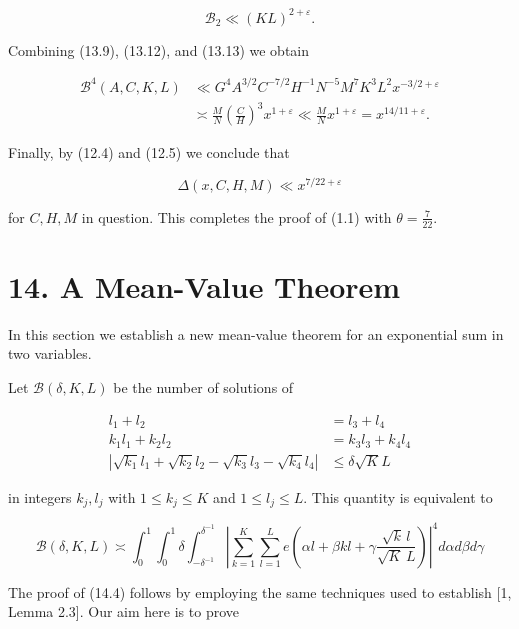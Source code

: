 \documentclass[10pt]{article}
\begin{document}
\begin{equation*}
\mathscr{B}_{2} \ll(K L)^{2+\varepsilon} . \tag{13.13}
\end{equation*}


Combining (13.9), (13.12), and (13.13) we obtain

$$
\begin{aligned}
\mathscr{B}^{4}(A,C,K,L) & \ll G^{4} A^{3 / 2} C^{-7 / 2} H^{-1} N^{-5} M^{7} K^{3} L^{2} x^{-3 / 2+\varepsilon} \\
& \asymp \frac{M}{N}\left(\frac{C}{H}\right)^{3} x^{1+\varepsilon}\ll\frac{M}{N}x^{1+\varepsilon}=x^{14 / 11+\varepsilon} .
\end{aligned}
$$

Finally, by (12.4) and (12.5) we conclude that

$$
\Delta(x,C,H,M)\ll x^{7/22+\varepsilon}
$$

for $C, H, M$ in question. This completes the proof of (1.1) with $\theta=\frac{7}{22}$.

\section*{14. A Mean-Value Theorem}
In this section we establish a new mean-value theorem for an exponential sum in two variables.

Let $\mathscr{B}(\delta, K, L)$ be the number of solutions of


\begin{align*}
l_{1}+l_{2} & =l_{3}+l_{4}  \tag{14.1}\\
k_{1} l_{1}+k_{2} l_{2} & =k_{3} l_{3}+k_{4} l_{4}  \tag{14.2}\\
\left|\sqrt{k_{1}} l_{1}+\sqrt{k_{2}} l_{2}-\sqrt{k_{3}} l_{3}-\sqrt{k_{4}} l_{4}\right| & \leqslant \delta \sqrt{K} L \tag{14.3}
\end{align*}


in integers $k_{j}, l_{j}$ with $1 \leqslant k_{j} \leqslant K$ and $1 \leqslant l_{j} \leqslant L$. This quantity is equivalent to


\begin{equation*}
\mathscr{B}(\delta, K, L) \asymp \int_{0}^{1} \int_{0}^{1} \delta \int_{-\delta^{-1}}^{\delta^{-1}}\left|\sum_{k=1}^{K}\sum_{l=1}^{L}e\left(\alpha l+\beta kl+\gamma\frac{\sqrt{k}\,l}{\sqrt{K}\,L}\right)\right|^{4} d \alpha d \beta d \gamma \tag{14.4}
\end{equation*}


The proof of (14.4) follows by employing the same techniques used to establish [1, Lemma 2.3]. Our aim here is to prove
\end{document}

